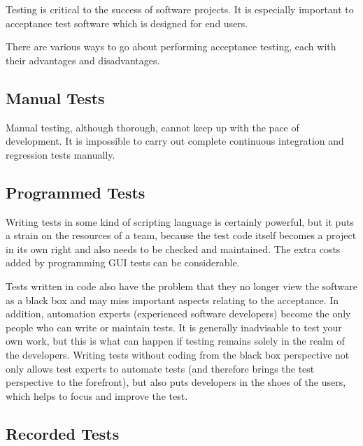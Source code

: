 
Testing is critical to the success of software projects. It is especially important to acceptance test software which is designed for end users.

There are various ways to go about performing acceptance testing, each with their advantages and disadvantages. 

\subsection{Manual Tests}

Manual testing, although thorough, cannot keep up with the pace of development. It is impossible to carry out complete continuous integration and regression tests manually. 


\subsection{Programmed Tests}

Writing tests in some kind of scripting language is certainly powerful, but it puts a strain on the resources of a team, because the test code itself becomes a project in its own right and also needs to be checked and maintained. The extra costs added by programming GUI tests can be considerable. 

Tests written in code also have the problem that they no longer view the software as a black box and may miss important aspects relating to the acceptance. In addition, automation experts (experienced software developers) become the only people who can write or maintain tests. It is generally inadvisable to test your own work, but this is what can happen if testing remains solely in the realm of the developers. Writing tests without coding from the black box perspective not only allows test experts to automate tests (and therefore brings the test perspective to the forefront), but also puts developers in the shoes of the users, which helps to focus and improve the test.  


\subsection{Recorded Tests}

